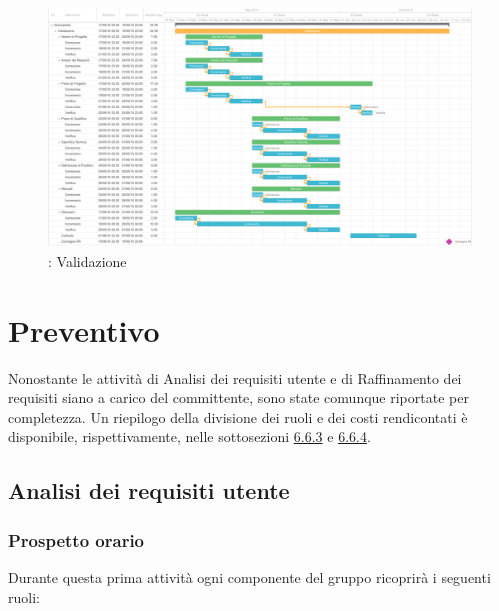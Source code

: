 \documentclass[a4paper, titlepage]{article}
\begin{document}
\newpage
\begin{figure}[!ht]
	\includegraphics[scale=0.3]{Img/Grafici_Gantt/Validazione.pdf}
	\caption{ : Validazione}
\end{figure}

\newpage
\section {Preventivo}\label{Preventivo}
Nonostante le attività di Analisi dei requisiti utente e di Raffinamento dei requisiti  siano a carico del committente, sono state comunque riportate per completezza. Un riepilogo della divisione dei ruoli e dei costi rendicontati è disponibile, rispettivamente, nelle sottosezioni \hyperref[Prospetto orario rendicontato]{6.6.3} e \hyperref[Prospetto economico rendicontato totale]{6.6.4}.
\subsection{Analisi dei requisiti utente}
\subsubsection{Prospetto orario}
Durante questa prima attività ogni componente del gruppo ricoprirà i seguenti ruoli:
\end{document}
